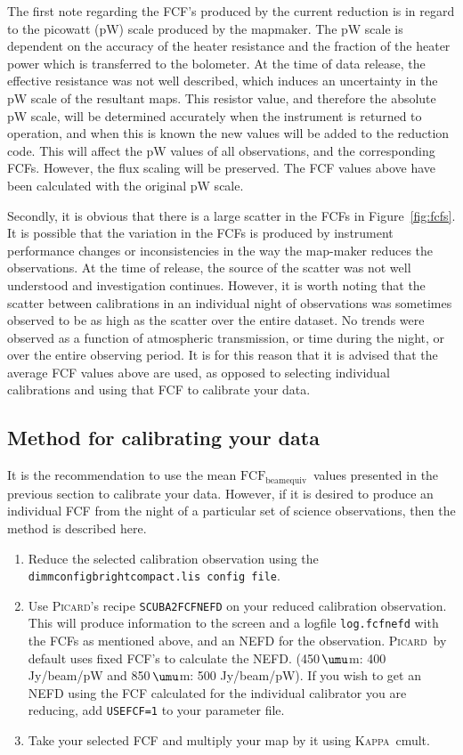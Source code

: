 \documentclass[twoside,11pt]{article}
\newcommand{\micron}{\mbox{\,${\umu}$m}}            %
\newcommand{\xref}[3]{#1}
\renewcommand{\_}{\texttt{\symbol{95}}}
\newcommand{\fcfbe}{$\mathrm{FCF_{beamequiv}}$}
\newcommand{\Kappa}{\xref{\textsc{Kappa}}{sun95}{}}
\newcommand{\picard}{\xref{\textsc{Picard}}{sun231}{}}
\newcommand{\drrecipe}[1]{\texttt{#1}}
\newcommand{\task}[1]{\textsf{#1}}
\newcommand{\cmult}{\xref{\task{cmult}}{sun95}{CMULT}}
\begin{document}
The first note regarding the FCF's produced by the current reduction
is in regard to the picowatt (pW) scale produced by the mapmaker. The
pW scale is dependent on the accuracy of the heater resistance and the
fraction of the heater power which is transferred to the bolometer. At
the time of data release, the effective resistance was not well
described, which induces an uncertainty in the pW scale of the
resultant maps. This resistor value, and therefore the absolute pW
scale, will be determined accurately when the instrument is returned
to operation, and when this is known the new values will be added to
the reduction code. This will affect the pW values of all
observations, and the corresponding FCFs. However, the flux scaling
will be preserved. The FCF values above have been calculated with the
original pW scale.

Secondly, it is obvious that there is a large scatter in the FCFs in
Figure~\ref{fig:fcfs}. It is possible that the variation in the FCFs
is produced by instrument performance changes or inconsistencies in
the way the map-maker reduces the observations. At the time of
release, the source of the scatter was not well understood and
investigation continues. However, it is worth noting that the scatter
between calibrations in an individual night of observations was
sometimes observed to be as high as the scatter over the entire
dataset. No trends were observed as a function of atmospheric
transmission, or time during the night, or over the entire observing
period. It is for this reason that it is advised that the average FCF
values above are used, as opposed to selecting individual calibrations
and using that FCF to calibrate your data.

\subsection{Method for calibrating your data}


It is the recommendation to use the mean \fcfbe\ values
presented in the previous section to calibrate your data. However, if
it is desired to produce an individual FCF from the night of a
particular set of science observations, then the method is described
here.

\begin{enumerate}
\item{Reduce the selected calibration observation using the
\texttt{dimmconfig\_bright\_compact.lis config file}.}
\item{Use \picard's recipe \drrecipe{SCUBA2\_FCFNEFD} on your reduced calibration
    observation. This will produce information to the screen and a
    logfile \texttt{log.fcfnefd} with the FCFs as mentioned above, and an NEFD
    for the observation. \picard\ by default uses fixed FCF's to
    calculate the NEFD. (450\micron: 400 Jy/beam/pW and 850\micron: 500
    Jy/beam/pW). If you wish to get an NEFD using the FCF calculated
    for the individual calibrator you are reducing, add \texttt{USEFCF=1} to
    your parameter file. }
\item{Take your selected FCF and multiply your map by it using \Kappa\
    \cmult.}
\end{enumerate}
\end{document}
